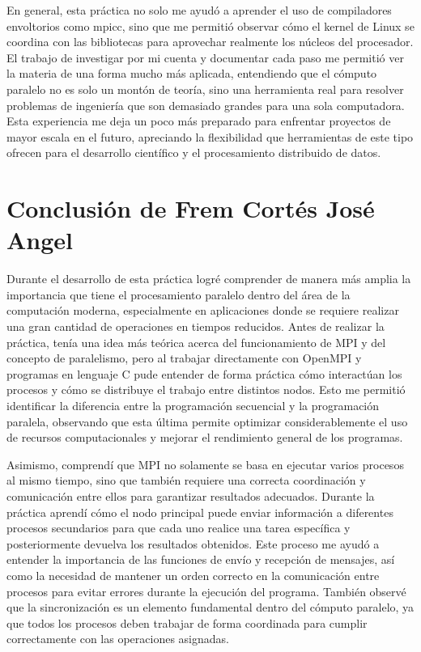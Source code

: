 En general, esta práctica no solo me ayudó a aprender el uso de compiladores envoltorios como mpicc, sino que me permitió observar cómo el kernel de 
Linux se coordina con las bibliotecas para aprovechar realmente los núcleos del procesador. El trabajo de investigar por mi cuenta y documentar cada 
paso me permitió ver la materia de una forma mucho más aplicada, entendiendo que el cómputo paralelo no es solo un montón de teoría, sino una 
herramienta real para resolver problemas de ingeniería que son demasiado grandes para una sola computadora. Esta experiencia me deja un poco más
 preparado para enfrentar proyectos de mayor escala en el futuro, apreciando la flexibilidad que herramientas de este tipo ofrecen para el desarrollo 
 científico y el procesamiento distribuido de datos. 
 
\newpage
\section{Conclusión de Frem Cortés José Angel}
Durante el desarrollo de esta práctica logré comprender de manera más amplia la importancia que tiene el procesamiento paralelo dentro del área de la computación moderna, especialmente en aplicaciones donde se requiere realizar una gran cantidad de operaciones en tiempos reducidos. Antes de realizar la práctica, tenía una idea más teórica acerca del funcionamiento de MPI y del concepto de paralelismo, pero al trabajar directamente con OpenMPI y programas en lenguaje C pude entender de forma práctica cómo interactúan los procesos y cómo se distribuye el trabajo entre distintos nodos. Esto me permitió identificar la diferencia entre la programación secuencial y la programación paralela, observando que esta última permite optimizar considerablemente el uso de recursos computacionales y mejorar el rendimiento general de los programas.

Asimismo, comprendí que MPI no solamente se basa en ejecutar varios procesos al mismo tiempo, sino que también requiere una correcta coordinación y comunicación entre ellos para garantizar resultados adecuados. Durante la práctica aprendí cómo el nodo principal puede enviar información a diferentes procesos secundarios para que cada uno realice una tarea específica y posteriormente devuelva los resultados obtenidos. Este proceso me ayudó a entender la importancia de las funciones de envío y recepción de mensajes, así como la necesidad de mantener un orden correcto en la comunicación entre procesos para evitar errores durante la ejecución del programa. También observé que la sincronización es un elemento fundamental dentro del cómputo paralelo, ya que todos los procesos deben trabajar de forma coordinada para cumplir correctamente con las operaciones asignadas.

